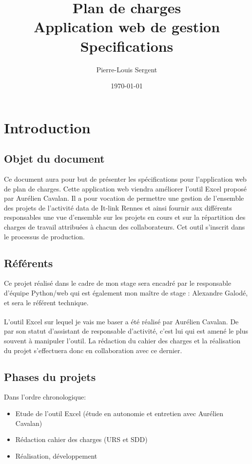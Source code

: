 \documentclass[french]{report}
\title{Plan de charges\\Application web de gestion\\Specifications}
\date{\today}
\author{Pierre-Louis Sergent}
\begin{document}
    \maketitle

    \tableofcontents

\chapter{Introduction}
  \section{Objet du document}

Ce document aura pour but de présenter les spécifications pour l’application web
de plan de charges. Cette application web viendra améliorer l’outil Excel
proposé par Aurélien Cavalan. Il a pour vocation de permettre une gestion de
l'ensemble des projets de l’activité data de It-link Rennes et ainsi fournir
aux différents responsables une vue d’ensemble sur les projets en cours et sur
la répartition des charges de travail attribuées à chacun des collaborateurs.
Cet outil s’inscrit dans le processus de production.

  \section{Référents}

Ce projet réalisé dans le cadre de mon stage sera encadré par le responsable
d’équipe Python/web qui est également mon maître de stage : Alexandre Galodé, et
sera le référent technique.\\\\
L’outil Excel sur lequel je vais me baser a été réalisé par Aurélien Cavalan. De
par son statut d’assistant de responsable d’activité, c’est lui qui est amené le
plus souvent à manipuler l’outil. La rédaction du cahier des charges et la
réalisation du projet s’effectuera donc en collaboration avec ce dernier.

  \section{Phases du projets}

Dans l'ordre chronologique:
\begin{itemize}[label=\textbullet, font=\normalfont \color{blue}]
  \item{Etude de l'outil Excel (étude en autonomie et entretien avec Aurélien Cavalan)}
  \item{Rédaction cahier des charges (URS et SDD)}
  \item{Réalisation, développement}
\end{itemize}
\end{document}

